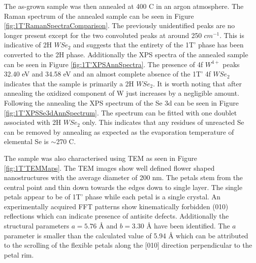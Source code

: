 The as-grown sample was then annealed at 400 {\degree}C in an argon atmosphere. The Raman spectrum of the annealed sample can be seen in Figure \ref{fig:1T'RamanSpectraComparison}. The previously unidentified peaks are no longer present except for the two convoluted peaks at around 250 $cm^{-1}$. This is indicative of 2H $WSe_2$ and suggests that the entirety of the 1T' phase has been converted to the 2H phase. Additionally the XPS spectra of the annealed sample can be seen in Figure \ref{fig:1T'XPSAnnSpectra}. The presence of 4f $W^{4+}$ peaks 32.40 eV and 34.58 eV and an almost complete absence of the 1T' 4f $WSe_2$ indicates that the sample is primarily a 2H $WSe_2$. It is worth noting that after annealing the oxidized component of W just increases by a negligible amount. Following the annealing the XPS spectrum of the Se 3d can be seen in Figure \ref{fig:1T'XPSSe3dAnnSpectrum}. The spectrum can be fitted with one doublet associated with 2H $WSe_2$ only. This indicates that any residues of unreacted Se can be removed by annealing as expected as the evaporation temperature of elemental Se is $\sim$270 {\degree}C. 

The sample was also characterised using TEM as seen in Figure \ref{fig:1T'TEMMaps}. The TEM images show well defined flower shaped nanostructures with the average diameter of 200 nm. The petals stem from the central point and thin down towards the edges down to single layer. The single petals appear to be of 1T' phase while each petal is a single crystal. An experimentally acquired FFT patterns show kinematically forbidden (010) reflections which can indicate presence of antisite defects. Additionally the structural parameters $a = 5.76$ \r{A} and $b = 3.30$ \r{A} have been identified. The $a$ parameter is smaller than the calculated value of 5.94 \r{A} \cite{Duerloo2014} which can be attributed to the scrolling of the flexible petals along the [010] direction perpendicular to the petal rim.

